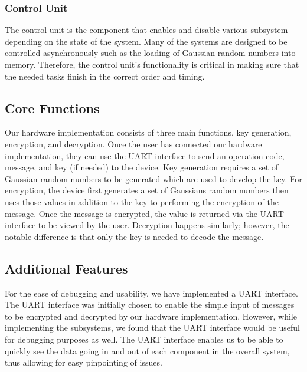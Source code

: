 \documentclass{article}
\begin{document}
\subsubsection{Control Unit}
The control unit is the component that enables and disable various subsystem depending on the state of the system. Many of the systems are designed to be controlled asynchronously such as the loading of Gaussian random numbers into memory. Therefore, the control unit's functionality is critical in making sure that the needed tasks finish in the correct order and timing.
\subsection{Core Functions}
Our hardware implementation consists of three main functions, key generation, encryption, and decryption. Once the user has connected our hardware implementation, they can use the UART interface to send an operation code, message, and key (if needed) to the device. Key generation requires a set of Gaussian random numbers to be generated which are used to develop the key. For encryption, the device first generates a set of Gaussians random numbers then uses those values in addition to the key to performing the encryption of the message. Once the message is encrypted, the value is returned via the UART interface to be viewed by the user. Decryption happens similarly; however, the notable difference is that only the key is needed to decode the message.
\subsection{Additional Features}
For the ease of debugging and usability, we have implemented a UART interface. The UART interface was initially chosen to enable the simple input of messages to be encrypted and decrypted by our hardware implementation. However, while implementing the subsystems, we found that the UART interface would be useful for debugging purposes as well. The UART interface enables us to be able to quickly see the data going in and out of each component in the overall system, thus allowing for easy pinpointing of issues. 
\
\end{document}
